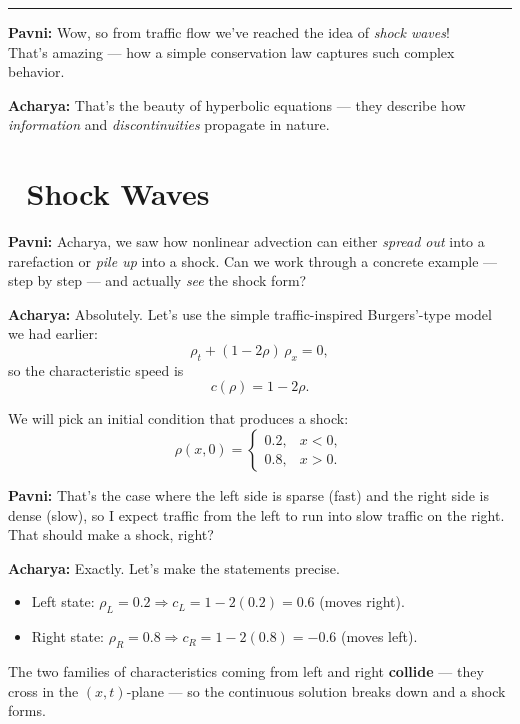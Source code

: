\documentclass[
  letterpaper,
]{book}
\providecommand{\tightlist}{%
  \setlength{\itemsep}{0pt}\setlength{\parskip}{0pt}}
\begin{document}
\begin{center}\rule{0.5\linewidth}{0.5pt}\end{center}

\textbf{Pavni:} Wow, so from traffic flow we've reached the idea of
\emph{shock waves}!\\
That's amazing --- how a simple conservation law captures such complex
behavior.

\textbf{Acharya:} That's the beauty of hyperbolic equations --- they
describe how \emph{information} and \emph{discontinuities} propagate in
nature.

\section{🚦 Shock Waves}\label{shock-waves}

\textbf{Pavni:} Acharya, we saw how nonlinear advection can either
\emph{spread out} into a rarefaction or \emph{pile up} into a shock. Can
we work through a concrete example --- step by step --- and actually
\emph{see} the shock form?

\textbf{Acharya:} Absolutely. Let's use the simple traffic-inspired
Burgers'-type model we had earlier: \[
\rho_t + (1-2\rho)\,\rho_x = 0,
\] so the characteristic speed is \[
c(\rho) = 1 - 2\rho.
\]

We will pick an initial condition that produces a shock: \[
\rho(x,0)=\begin{cases}
0.2, & x<0,\\[4pt]
0.8, & x>0.
\end{cases}
\]

\textbf{Pavni:} That's the case where the left side is sparse (fast) and
the right side is dense (slow), so I expect traffic from the left to run
into slow traffic on the right. That should make a shock, right?

\textbf{Acharya:} Exactly. Let's make the statements precise.

\begin{itemize}
\tightlist
\item
  Left state: \(\rho_L=0.2 \Rightarrow c_L = 1-2(0.2)=0.6\) (moves
  right).\\
\item
  Right state: \(\rho_R=0.8 \Rightarrow c_R = 1-2(0.8)=-0.6\) (moves
  left).
\end{itemize}

The two families of characteristics coming from left and right
\textbf{collide} --- they cross in the \((x,t)\)-plane --- so the
continuous solution breaks down and a shock forms.
\end{document}
